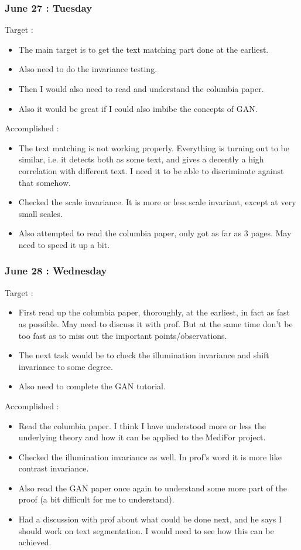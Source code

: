 \documentclass{article}
\begin{document}
\subsubsection{June 27 : Tuesday}
Target :
\begin{itemize}
\item The main target is to get the text matching part done at the earliest.
\item Also need to do the invariance testing.
\item Then I would also need to read and understand the columbia paper.
\item Also it would be great if I could also imbibe the concepts of GAN.
\end{itemize}

Accomplished :
\begin{itemize}
\item The text matching is not working properly. Everything is turning out to be similar, i.e. it detects both as some text, and gives a decently a high correlation with different text. I need it to be able to discriminate against that somehow.
\item Checked the scale invariance. It is more or less scale invariant, except at very small scales.
\item Also attempted to read the columbia paper, only got as far as 3 pages. May need to speed it up a bit.
\end{itemize}

\subsubsection{June 28 : Wednesday}
Target :
\begin{itemize}
\item First read up the columbia paper, thoroughly, at the earliest, in fact as fast as possible. May need to discuss it with prof. But at the same time don't be too fast as to miss out the important points/observations.
\item The next task would be to check the illumination invariance and shift invariance to some degree.
\item Also need to complete the GAN tutorial.
\end{itemize}

Accomplished :
\begin{itemize}
\item Read the columbia paper. I think I have understood more or less the underlying theory and how it can be applied to the MediFor project.
\item Checked the illumination invariance as well. In prof's word it is more like contrast invariance.
\item Also read the GAN paper once again to understand some more part of the proof (a bit difficult for me to understand).
\item Had a discussion with prof about what could be done next, and he says I should work on text segmentation. I would need to see how this can be achieved.
\end{itemize}
\end{document}
